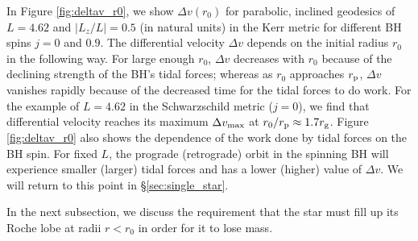 \documentclass[useAMS,usenatbib]{mn2e}
\def\rg{r_{\rm g}}
\def\rp{r_{\rm p}}
\def\note{\textcolor{magenta}}
\begin{document}
In Figure \ref{fig:deltav_r0}, we show $\Delta v(r_0)$ for parabolic, inclined geodesics of $L=4.62$ and $|L_z/L| = 0.5$ (in natural units) in the Kerr metric for different BH spins $j=0$ and $0.9$. The differential velocity $\Delta v$ depends on the initial radius $r_0$ in the following way. For large enough $r_0$, $\Delta v$ decreases with $r_0$ because of the declining strength of the BH's tidal forces; whereas as $r_0$ approaches $\rp$, $\Delta v$ vanishes rapidly because of the decreased time for the tidal forces to do work. For the example of $L=4.62$ in the Schwarzschild metric ($j=0$), we find that differential velocity reaches its maximum $\Delta v_{\rm max}$ at $r_0/\rp\approx1.7\rg$.
Figure \ref{fig:deltav_r0} also shows the dependence of the work done by tidal forces on the BH spin. For fixed $L$, the prograde (retrograde) orbit in the spinning BH will experience smaller (larger) tidal forces and has a lower (higher) value of $\Delta v$.
We will return to this point in \S \ref{sec:single_star}.


In the next subsection, we discuss the requirement that the star must fill up its Roche lobe at radii $r < r_0$ in order for it to lose mass.


\end{document}
